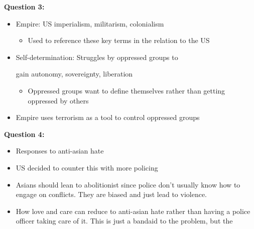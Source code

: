 \documentclass{article}
\begin{document}
\textbf{Question 3:}
\begin{itemize}
  \item Empire: US imperialism, militarism, colonialism
    \begin{itemize}
      \item Used to reference these key terms in the relation to the US
    \end{itemize}
  \item Self-determination: Struggles by oppressed groups to

    gain autonomy, sovereignty, liberation
    \begin{itemize}
      \item Oppressed groups want to define themselves rather than getting oppressed
        by others
    \end{itemize}
  \item Empire uses terrorism as a tool to control oppressed groups
\end{itemize}

\noindent \textbf{Question 4:}
\begin{itemize}
  \item Responses to anti-asian hate
  \item US decided to counter this with
    more policing
  \item Asians should lean to abolitionist since
    police don't usually know how to engage on conflicts.
    They are biased and just lead to violence.
  \item How love and care can reduce to anti-asian hate
    rather than having a police officer taking care of it.
    This is just a bandaid to the problem, but the
\end{itemize}
\end{document}
